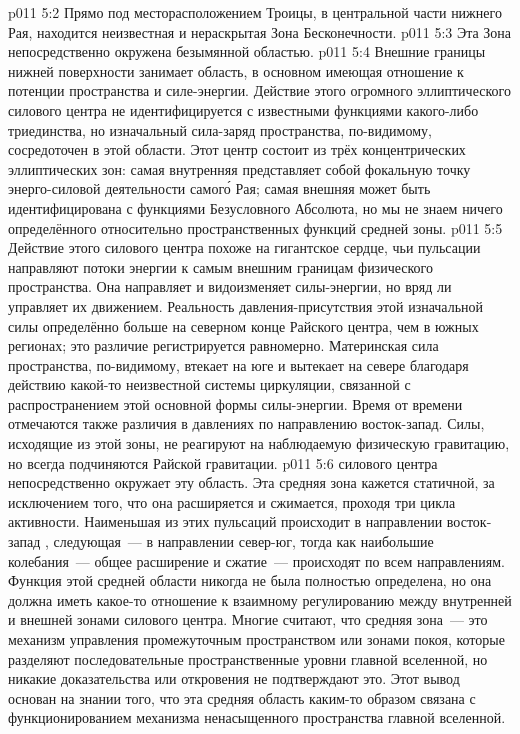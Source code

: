 \vs p011 5:2 Прямо под месторасположением Троицы, в центральной части нижнего Рая, находится неизвестная и нераскрытая Зона Бесконечности.
\vs p011 5:3 Эта Зона непосредственно окружена безымянной областью.
\vs p011 5:4 Внешние границы нижней поверхности занимает область, в основном имеющая отношение к потенции пространства и силе\hyp{}энергии. Действие этого огромного эллиптического силового центра не идентифицируется с известными функциями какого\hyp{}либо триединства, но изначальный сила\hyp{}заряд пространства, по\hyp{}видимому, сосредоточен в этой области. Этот центр состоит из трёх концентрических эллиптических зон: самая внутренняя представляет собой фокальную точку энерго\hyp{}силовой деятельности самог\'о Рая; самая внешняя может быть идентифицирована с функциями Безусловного Абсолюта, но мы не знаем ничего определённого относительно пространственных функций средней зоны.
\vs p011 5:5 \pc Действие  этого силового центра похоже на гигантское сердце, чьи пульсации направляют потоки энергии к самым внешним границам физического пространства. Она направляет и видоизменяет силы\hyp{}энергии, но вряд ли управляет их движением. Реальность давления\hyp{}присутствия этой изначальной силы определённо больше на северном конце Райского центра, чем в южных регионах; это различие регистрируется равномерно. Материнская сила пространства, по\hyp{}видимому, втекает на юге и вытекает на севере благодаря действию какой\hyp{}то неизвестной системы циркуляции, связанной с распространением этой основной формы силы\hyp{}энергии. Время от времени отмечаются также различия в давлениях по направлению восток\hyp{}запад. Силы, исходящие из этой зоны, не реагируют на наблюдаемую физическую гравитацию, но всегда подчиняются Райской гравитации.
\vs p011 5:6 \pc {} силового центра непосредственно окружает эту область. Эта средняя зона кажется статичной, за исключением того, что она расширяется и сжимается, проходя три цикла активности. Наименьшая из этих пульсаций происходит в направлении восток\hyp{}запад , следующая~--- в направлении север\hyp{}юг, тогда как наибольшие колебания~--- общее расширение и сжатие~--- происходят по всем направлениям. Функция этой средней области никогда не была полностью определена, но она должна иметь какое\hyp{}то отношение к взаимному регулированию между внутренней и внешней зонами силового центра. Многие считают, что средняя зона~--- это механизм управления промежуточным пространством или зонами покоя, которые разделяют последовательные пространственные уровни главной вселенной, но никакие доказательства или откровения не подтверждают это. Этот вывод основан на знании того, что эта средняя область каким\hyp{}то образом связана с функционированием механизма ненасыщенного пространства главной вселенной.

